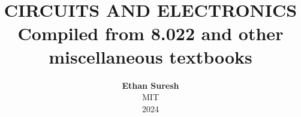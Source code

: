 \documentclass[openany,oneside]{book}
\begin{document}

\title{ \normalsize \textsc{}
		\\ [2.0cm]
		\HRule{1.5pt} \\
		\LARGE \textbf{\uppercase{Circuits and Electronics}
		\HRule{2.0pt} \\ [0.6cm] \LARGE{Compiled from 8.022 and other miscellaneous textbooks} \vspace*{10\baselineskip}}
		}
\date{}
\author{\textbf{Ethan Suresh} \\
		MIT \\
		2024}

\maketitle
\newpage

\tableofcontents
\newpage



\end{document}
